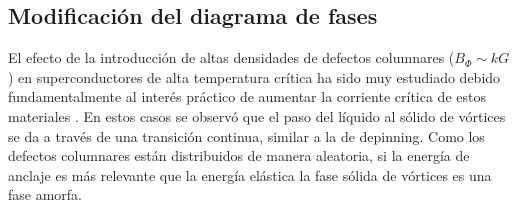 \documentclass[a4paper,conference]{IEEEtran}
\begin{document}
\subsection{Modificaci\'{o}n del diagrama de fases}

El efecto de la introducci\'{o}n de altas densidades de defectos columnares
($B_\Phi \sim kG$) en superconductores de alta temperatura cr\'{i}tica ha sido muy
estudiado debido fundamentalmente al inter\'{e}s pr\'{a}ctico de aumentar la
corriente cr\'{i}tica de estos materiales \cite{Marwick1991, Konczykowski1991}. En
estos casos se observ\'{o} que el paso del l\'{i}quido al s\'{o}lido de v\'{o}rtices
se da a trav\'{e}s de una transici\'{o}n continua, similar a la de depinning.
Como los defectos columnares est\'{a}n distribuidos de manera aleatoria, si la
energ\'{i}a de anclaje es m\'{a}s relevante que la energ\'{i}a el\'{a}stica la fase
s\'{o}lida de v\'{o}rtices es una fase amorfa. 

\end{document}
